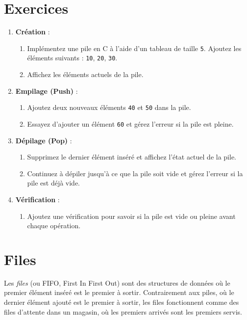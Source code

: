 \section*{Exercices}
\begin{enumerate}
	\item \textbf{Création} :
	\begin{enumerate}
		\item Implémentez une pile en C à l'aide d'un tableau de taille \texttt{5}. Ajoutez les éléments suivants : \texttt{10}, \texttt{20}, \texttt{30}.
		\item Affichez les éléments actuels de la pile.
	\end{enumerate}
	
	\item \textbf{Empilage (Push)} :
	\begin{enumerate}
		\item Ajoutez deux nouveaux éléments \texttt{40} et \texttt{50} dans la pile.
		\item Essayez d’ajouter un élément \texttt{60} et gérez l’erreur si la pile est pleine.
	\end{enumerate}
	
	\item \textbf{Dépilage (Pop)} :
	\begin{enumerate}
		\item Supprimez le dernier élément inséré et affichez l’état actuel de la pile.
		\item Continuez à dépiler jusqu’à ce que la pile soit vide et gérez l’erreur si la pile est déjà vide.
	\end{enumerate}
	
	\item \textbf{Vérification} : 
	\begin{enumerate}
		\item Ajoutez une vérification pour savoir si la pile est vide ou pleine avant chaque opération.
	\end{enumerate}
\end{enumerate}


\section{Files}

Les \emph{files} (ou FIFO, First In First Out) sont des structures de données où le premier élément inséré est le premier à sortir. Contrairement aux piles, où le dernier élément ajouté est le premier à sortir, les files fonctionnent comme des files d'attente dans un magasin, où les premiers arrivés sont les premiers servis.

